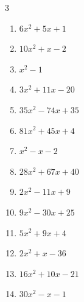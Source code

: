 \begin{multicols}{3}
\begin{enumerate}
        \phantom{$=(5x-6)(4x-5)$}

\columnbreak %

  \item $6x^{2}+5x+1$

        \phantom{$=(2x+1)(3x+1)$}

  \item $10x^{2}+x-2$

        \phantom{$=(5x-2)(2x+1)$}

  \item $x^{2}-1$

        \phantom{$=(x-1)(x+1)$}

  \item $3x^{2}+11x-20$

        \phantom{$=(3x-4)(x+5)$}

  \item $35x^{2}-74x+35$

        \phantom{$=(7x-5)(5x-7)$}

  \item $81x^{2}+45x+4$

        \phantom{$=(9x+4)(9x+1)$}

  \item $x^{2}-x-2$

        \phantom{$=(x+1)(x-2)$}

  \item $28x^{2}+67x+40$

        \phantom{$=(7x+8)(4x+5)$}

  \item $2x^{2}-11x+9$

        \phantom{$=(2x-9)(x-1)$}

  \item $9x^{2}-30x+25$


\columnbreak %

  \item $5x^{2}+9x+4$

        \phantom{$=(x+1)(5x+4)$}

  \item $2x^{2}+x-36$

        \phantom{$=(2x+9)(x-4)$}

  \item $16x^{2}+10x-21$

        \phantom{$=(8x-7)(2x+3)$}

  \item $30x^{2}-x-1$


\end{enumerate}
\end{multicols}

